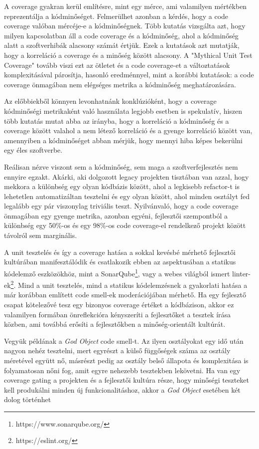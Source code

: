 A coverage gyakran kerül említésre, mint egy mérce, ami valamilyen mértékben reprezentálja a kódminőséget. Felmerülhet azonban a kérdés, hogy a code coverage valóban mércéje-e a kódminőségnek. Több kutatás \cite{onRelation}\cite{singhkochhar:hal-01653728} vizsgálta azt, hogy milyen kapcsolatban áll a code coverage és a kódminőség, ahol a kódminőség alatt a szoftverhibák alacsony számát értjük. Ezek a kutatások azt mutatják, hogy a korreláció a coverage és a minőség között alacsony. A "Mythical Unit Test Coverage"\cite{mythical} tovább viszi ezt az ötletet és a code coverage-et a változtatások komplexitásával párosítja, hasonló eredménnyel, mint a korábbi kutatások: a code coverage önmagában nem elégséges metrika a kódminőség meghatározására.

Az előbbiekből könnyen levonhatnánk konklúzióként, hogy a coverage kódminőségi metrikaként való használata legjobb esetben is spekulatív, hiszen több kutatás mutat abba az irányba, hogy a korreláció a kódminőség és a coverage között valahol a nem létező korreláció és a gyenge korreláció között van, amennyiben a kódminőséget abban mérjük, hogy mennyi hiba képes bekerülni egy éles szoftverbe.

Reálisan nézve viszont sem a kódminőség, sem maga a szoftverfejlesztés nem ennyire egzakt. Akárki, aki dolgozott legacy projekten tisztában van azzal, hogy mekkora a különbség egy olyan kódbázis között, ahol a legkisebb refactor-t is lehetetlen automatizáltan tesztelni és egy olyan között, ahol minden osztályt fed legalább egy pár viszonylag triviális teszt. Nyilvánvaló, hogy a code coverage önmagában egy gyenge metrika, azonban egyéni, fejlesztői szempontból a különbség egy 50\%-os és egy 98\%-os code coverage-el rendelkező projekt között távolról sem marginális.

A unit tesztelés és így a coverage hatása a sokkal kevésbé mérhető fejlesztői kultúrában manifesztálódik és csatlakozik ebben az aspektusában a statikus kódelemző eszközökhöz, mint a SonarQube\footnote{https://www.sonarqube.org/}, vagy a webes világból ismert linter-ek\footnote{https://eslint.org/}. Mind a unit tesztelés, mind a statikus kódelemzésnek a gyakorlati hatása a már korábban említett code smell-ek moderációjában mérhető. Ha egy fejlesztő csapat kötelezővé tesz egy bizonyos coverage értéket a kódbázison, akkor ez valamilyen formában önreflekcióra kényszeríti a fejlesztőket a tesztek írása közben, ami továbbá erősíti a fejlesztőkben a minőség-orientált kultúrát.

Vegyük példának a \textit{God Object} code smell-t. Az ilyen osztályokat egy idő után nagyon nehéz tesztelni, mert egyrészt a külső függőségek száma az osztály méretével együtt nő, másrészt pedig az osztály belső állapota és komplexitása is folyamatosan nőni fog, amit egyre nehezebb tesztekben lekövetni. Ha van egy coverage gating a projekten és a fejlesztői kultúra része, hogy minőségi teszteket kell produkálni minden új funkcionalitáshoz, akkor a \textit{God Object} esetében két dolog történhet

